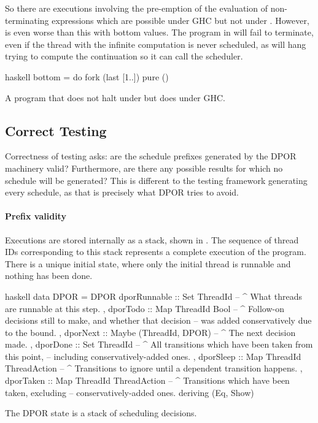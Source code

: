 So there are executions involving the pre-emption of the evaluation of
non-terminating expressions which are possible under GHC but not under
\dejafu{}.  However, \dejafu{} is even worse than this with bottom
values.  The program in  will fail to terminate, even
if the thread with the infinite computation is never scheduled, as
\dejafu{} will hang trying to compute the continuation so it can call
the scheduler.

\begin{listing}
\centering
\begin{cminted}{haskell}
bottom = do
  fork (last [1..])
  pure ()
\end{cminted}
\caption{A program that does not halt under \dejafu{} but does under GHC.}\label{lst:bottom}
\end{listing}

\subsection{Correct Testing}

Correctness of testing asks: are the schedule prefixes generated by
the DPOR machinery valid?  Furthermore, are there any possible results
for which no schedule will be generated?  This is different to the
testing framework generating every schedule, as that is precisely what
DPOR tries to avoid.

\paragraph{Prefix validity}
Executions are stored internally as a stack, shown in .
The sequence of thread IDs corresponding to this stack represents a
complete execution of the program.  There is a unique initial state,
where only the initial thread is runnable and nothing has been done.

\begin{listing}
\centering
\begin{cminted}{haskell}
data DPOR = DPOR
  { dporRunnable :: Set ThreadId
  -- ^ What threads are runnable at this step.
  , dporTodo     :: Map ThreadId Bool
  -- ^ Follow-on decisions still to make, and whether that decision
  -- was added conservatively due to the bound.
  , dporNext     :: Maybe (ThreadId, DPOR)
  -- ^ The next decision made.
  , dporDone     :: Set ThreadId
  -- ^ All transitions which have been taken from this point,
  -- including conservatively-added ones.
  , dporSleep    :: Map ThreadId ThreadAction
  -- ^ Transitions to ignore until a dependent transition happens.
  , dporTaken    :: Map ThreadId ThreadAction
  -- ^ Transitions which have been taken, excluding
  -- conservatively-added ones.
  } deriving (Eq, Show)
\end{cminted}
\caption{The DPOR state is a stack of scheduling decisions.}\label{lst:dpor}
\end{listing}


